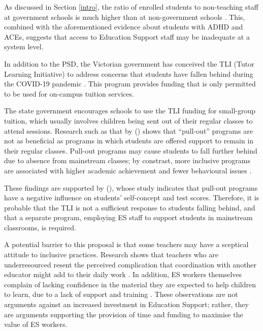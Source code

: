 \documentclass[11pt, a4paper]{article}
\begin{document}
    As discussed in Section \ref{intro}, the ratio of enrolled students to non-teaching staff at government schools is much higher than at non-government schools \parencite{acara_profiles}. This, combined with the aforementioned evidence about students with ADHD and ACEs, suggests that access to Education Support staff may be inadequate at a system level.

    In addition to the PSD, the Victorian government has conceived the TLI (Tutor Learning Initiative) to address concerns that students have fallen behind during the COVID-19 pandemic \parencite{tli}. This program provides funding that is only permitted to be used for on-campus tuition services. 

    The state government encourages schools to use the TLI funding for small-group tuition, which usually involves children being sent out of their regular classes to attend sessions. Research such as that by  () shows that ``pull-out'' programs are not as beneficial as programs in which students are offered support to remain in their regular classes. Pull-out programs may cause students to fall further behind due to absence from mainstream classes; by constrast, more inclusive programs are associated with higher academic achievement and fewer behavioural issues \parencite{pullout_rea}.
    
    These findings are supported by  (), whose study indicates that pull-out programs have a negative influence on students' self-concept and test scores. Therefore, it is probable that the TLI is not a sufficient response to students falling behind, and that a separate program, employing ES staff to support students in mainstream classrooms, is required.

    A potential barrier to this proposal is that some teachers may have a sceptical attitude to inclusive practices. Research shows that teachers who are underresourced resent the perceived complication that coordination with another educator might add to their daily work \parencite{teacher_attitudes}. In addition, ES workers themselves complain of lacking confidence in the material they are expected to help children to learn, due to a lack of support and training \parencite{unimelb_aides}. These observations are not arguments against an increased investment in Education Support; rather, they are arguments supporting the provision of time and funding to maximise the value of ES workers.
\end{document}
